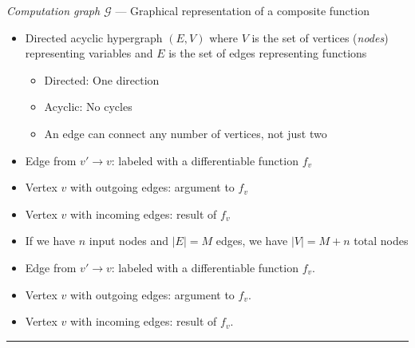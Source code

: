 \emph{Computation graph $\mathcal{G}$} --- Graphical representation of a composite function
\begin{itemize}
    \item Directed acyclic hypergraph $(E, V)$ where $V$ is the set of vertices (\emph{nodes}) representing variables and $E$ is the set of edges representing functions
    \begin{itemize}
        \item Directed: One direction
        \item Acyclic: No cycles
        \item An edge can connect any number of vertices, not just two
    \end{itemize}
    \item Edge from $v' \to v$: labeled with a differentiable function $f_v$
    \item Vertex $v$ with outgoing edges: argument to $f_v$
    \item Vertex $v$ with incoming edges: result of $f_v$
    \item If we have $n$ input nodes and $|E| = M$ edges, we have $|V| = M + n$ total nodes
\end{itemize}

\begin{itemize}
    \item Edge from $v' \to v$: labeled with a differentiable function $f_v$.
    \item Vertex $v$ with outgoing edges: argument to $f_v$.
    \item Vertex $v$ with incoming edges: result of $f_v$.
\end{itemize}

{\color{lightgray}\hrule height 0.001mm}

